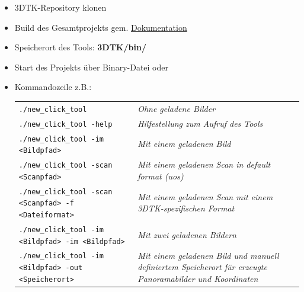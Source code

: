 \documentclass[a4paper,10pt]{scrartcl}
\begin{document}
\begin{itemize}
	\item 3DTK-Repository klonen
	\item Build des Gesamtprojekts gem. \href{https://github.com/JMUWRobotics/3DTK/blob/main/README.md}{Dokumentation}
	\item Speicherort des Tools: \textbf{3DTK/bin/}
	\item Start des Projekts über Binary-Datei oder
	\item Kommandozeile \hspace{2em} z.B.:\\
\begin{tabular}{p{9.3cm} p{5.7cm}}
		\texttt{./new\_click\_tool} & \textit{Ohne geladene Bilder}\\
		
		\texttt{./new\_click\_tool -help} & \textit{Hilfestellung zum Aufruf des Tools}\\
		
		\texttt{./new\_click\_tool -im <Bildpfad>} & \textit{Mit einem geladenen Bild}\\
		
		\texttt{./new\_click\_tool -scan <Scanpfad>} & \textit{Mit einem geladenen Scan in default format (uos)}\\

		\texttt{./new\_click\_tool -scan <Scanpfad> -f <Dateiformat>} & \textit{Mit einem geladenen Scan mit einem 3DTK-spezifischen Format}\\
		
		\texttt{./new\_click\_tool -im <Bildpfad> -im <Bildpfad>} & \textit{Mit zwei geladenen Bildern}\\
		
		
		\texttt{./new\_click\_tool -im <Bildpfad> -out <Speicherort>} & \textit{Mit einem geladenen Bild und manuell definiertem Speicherort für erzeugte Panoramabilder und Koordinaten}\\
		
	\end{tabular}
\end{itemize}
\end{document}
